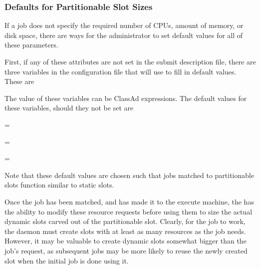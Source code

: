 \subsubsection{\label{sec:SMP-resource-defaults}
Defaults for Partitionable Slot Sizes}

If a job does not specify the required number of CPUs, amount of memory,
or disk space, there are ways for the administrator to set default
values for all of these parameters.

First, if any of these attributes are not set in the submit description file,
there are three variables in the configuration file that 
will use to fill in default values.  These are

\begin{description}
  \item{}
  \item{}
  \item{}
\end{description}

The value of these variables can be ClassAd expressions.  
The default values for these variables, should they not be set are

\begin{description}
  \item{ = }
  \item{ = }
  \item{ = }
\end{description}

Note that these default values are chosen such that 
jobs matched to partitionable slots function similar to static slots.

Once the job has been matched, 
and has made it to the execute machine, 
the  has the ability to modify these 
resource requests before using them to size the
actual dynamic slots carved out of the partitionable slot.  
Clearly, for the job to work,
the  daemon must create slots with at least 
as many resources as the job needs.  
However,
it may be valuable to create dynamic slots somewhat bigger 
than the job's request, 
as subsequent jobs may be more likely to reuse the newly created slot 
when the initial job is done using it.

